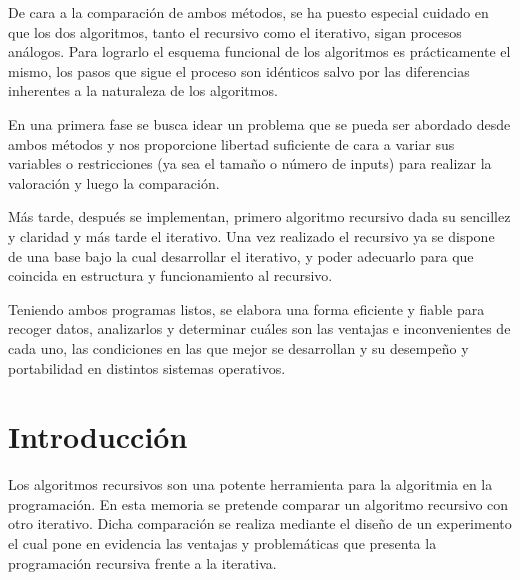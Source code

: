 \documentclass[12pt,a4paper]{article}
\begin{document}
\vspace{0.2cm}
De cara a la comparación de ambos métodos, se ha puesto especial cuidado en que los dos algoritmos, tanto el recursivo como el iterativo, sigan procesos análogos. Para lograrlo el esquema funcional de los algoritmos es prácticamente el mismo, los pasos que sigue el proceso son idénticos salvo por las diferencias inherentes a la naturaleza de los algoritmos.

\vspace{0.2cm}
En una primera fase se busca idear un problema que se pueda ser abordado desde ambos métodos y nos proporcione libertad suficiente de cara a variar sus variables o restricciones (ya sea el tamaño o número de inputs) para realizar la valoración y luego la comparación.

\vspace{0.2cm}
Más tarde, después se implementan, primero algoritmo recursivo dada su sencillez y claridad y más tarde el iterativo. Una vez realizado el recursivo ya se dispone de una base bajo la cual desarrollar el iterativo, y poder adecuarlo para que coincida en estructura y funcionamiento al recursivo.

\vspace{0.2cm}
Teniendo ambos programas listos, se elabora una forma eficiente y fiable para recoger datos, analizarlos y determinar cuáles son las ventajas e inconvenientes de cada uno, las condiciones en las que mejor se desarrollan y su desempeño y portabilidad en distintos sistemas operativos.
\clearpage
{
 \hypersetup{linkcolor=black}%
 
 \tableofcontents
}

\clearpage



\section*{Introducción}
Los algoritmos recursivos son una potente herramienta para la algoritmia en la programación. En esta memoria se pretende comparar un algoritmo recursivo con otro iterativo. Dicha comparación se realiza mediante el diseño de un experimento el cual pone en evidencia las ventajas y problemáticas que presenta la programación recursiva frente a la iterativa.
\end{document}
